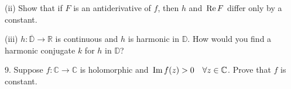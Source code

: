 \documentclass[12pt]{article}
\def\D{{\mathbb D} }
\def\C{{\mathbb C} }
\def\R{{\mathbb R} }
\def\Im{{\hbox{\,Im\,}}}
\def\Re{{\hbox{\,Re\,}}}
\begin{document}
\begin{description}
\item\quad (ii)
Show that if $F$ is an antiderivative of $f$,
then $h$ and $\Re F$ differ only by a constant.

\item\quad (iii)
$h:\overline{\D}\to\R$ is continuous and $h$ is harmonic in $\D$.
How would you find a harmonic conjugate $k$ for $h$ in $\D$?

\item 9.
Suppose $f:\C\to\C$ is holomorphic and
$ \Im f(z)>0 \quad \forall z\in\C$. Prove that $f$ is constant.




\end{description}
\end{document}
